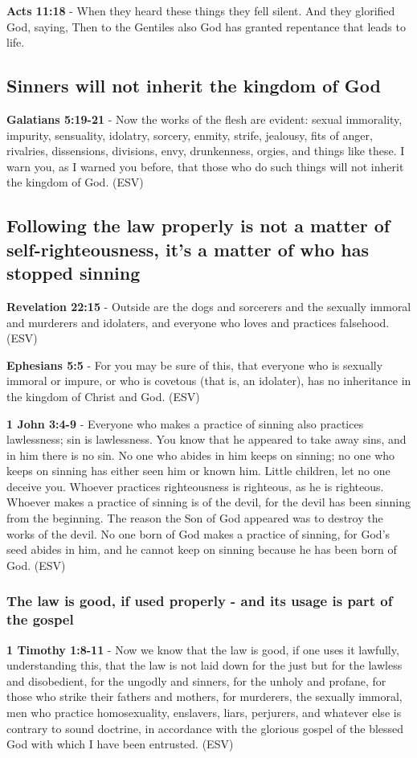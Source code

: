 \documentclass[11pt]{article}
\begin{document}
\textbf{Acts 11:18} - When they heard these things they fell silent. And they glorified God, saying, Then to the Gentiles also God has granted repentance that leads to life.

\subsection{Sinners will not inherit the kingdom of God}
\label{sec:orgdf4c1ea}
\textbf{Galatians 5:19-21} -  Now the works of the flesh are evident: sexual immorality, impurity, sensuality, idolatry, sorcery, enmity, strife, jealousy, fits of anger, rivalries, dissensions, divisions, envy, drunkenness, orgies, and things like these.  I warn you, as I warned you before, that those who do such things will not inherit the kingdom of God.  (ESV)

\subsection{Following the law properly is not a matter of self-righteousness, it's a matter of who has stopped sinning}
\label{sec:orga8e2868}
\textbf{Revelation 22:15} -  Outside are the dogs and sorcerers and the sexually immoral and murderers and idolaters, and everyone who loves and practices falsehood.  (ESV)

\textbf{Ephesians 5:5} -  For you may be sure of this, that everyone who is sexually immoral or impure, or who is covetous (that is, an idolater), has no inheritance in the kingdom of Christ and God.  (ESV)

\textbf{1 John 3:4-9} -  Everyone who makes a practice of sinning also practices lawlessness; sin is lawlessness.  You know that he appeared to take away sins, and in him there is no sin.  No one who abides in him keeps on sinning; no one who keeps on sinning has either seen him or known him.  Little children, let no one deceive you.  Whoever practices righteousness is righteous, as he is righteous.  Whoever makes a practice of sinning is of the devil, for the devil has been sinning from the beginning.  The reason the Son of God appeared was to destroy the works of the devil.  No one born of God makes a practice of sinning, for God's seed abides in him, and he cannot keep on sinning because he has been born of God.  (ESV)

\subsubsection{The law is good, if used properly - and its usage is part of the gospel}
\label{sec:orgd49a13e}
\textbf{1 Timothy 1:8-11} - Now we know that the law is good, if one uses it lawfully, understanding this, that the law is not laid down for the just but for the lawless and disobedient, for the ungodly and sinners, for the unholy and profane, for those who strike their fathers and mothers, for murderers, the sexually immoral, men who practice homosexuality, enslavers, liars, perjurers, and whatever else is contrary to sound doctrine, in accordance with the glorious gospel of the blessed God with which I have been entrusted. (ESV)
\end{document}
